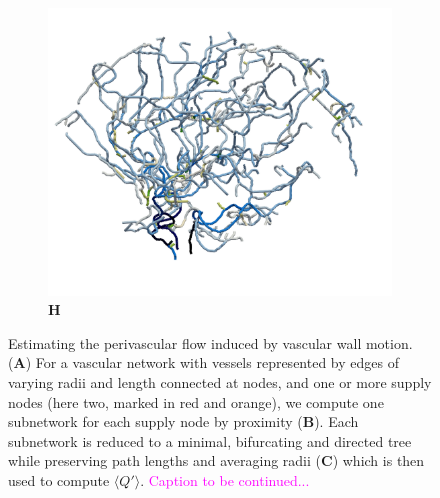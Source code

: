 \documentclass{article}
\begin{document}
\begin{figure}[t!]
\hfill
\begin{subfigure}{0.32\textwidth}
\caption*{\bf H}
\vspace{-2em}
\includegraphics[width=\textwidth]{../figures/pvs_Q_vasomotion_+x.png}
\end{subfigure}
\vspace{-1em}
\caption{Estimating the perivascular flow induced by vascular wall motion. (\textbf{A}) For a vascular network with vessels
    represented by edges of varying radii and length connected at
    nodes, and one or more supply nodes (here two, marked in red and
    orange), we compute one subnetwork for each supply node by
    proximity (\textbf{B}). Each subnetwork is reduced to a minimal,
    bifurcating and directed tree while preserving path lengths and averaging radii (\textbf{C}) which is then used to
    compute $\langle Q' \rangle$. \textcolor{magenta}{Caption to be continued...}}
    \label{fig:sup:peristalsis}
\end{figure}
\end{document}
